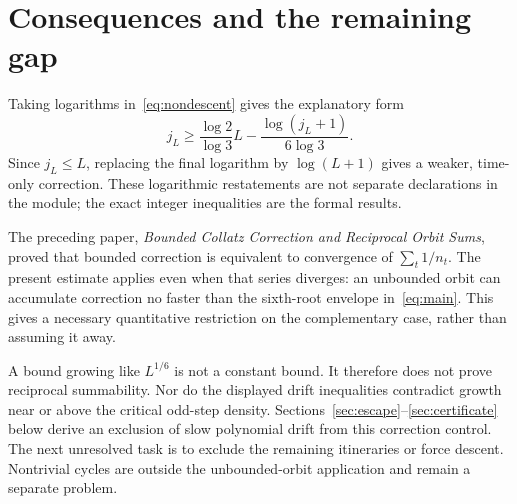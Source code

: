 \documentclass[11pt]{article}
\begin{document}
\newpage
\section{Consequences and the remaining gap}
Taking logarithms in~\eqref{eq:nondescent} gives the explanatory form
\[
j_L\ge\frac{\log2}{\log3}L-\frac{\log(j_L+1)}{6\log3}.
\]
Since $j_L\le L$, replacing the final logarithm by $\log(L+1)$ gives a weaker, time-only correction. These logarithmic restatements are not separate declarations in the module; the exact integer inequalities are the formal results.

The preceding paper, \emph{Bounded Collatz Correction and Reciprocal Orbit Sums}, proved that bounded correction is equivalent to convergence of $\sum_t1/n_t$. The present estimate applies even when that series diverges: an unbounded orbit can accumulate correction no faster than the sixth-root envelope in~\eqref{eq:main}. This gives a necessary quantitative restriction on the complementary case, rather than assuming it away.

A bound growing like $L^{1/6}$ is not a constant bound. It therefore does not prove reciprocal summability. Nor do the displayed drift inequalities contradict growth near or above the critical odd-step density. Sections~\ref{sec:escape}--\ref{sec:certificate} below derive an exclusion of slow polynomial drift from this correction control. The next unresolved task is to exclude the remaining itineraries or force descent. Nontrivial cycles are outside the unbounded-orbit application and remain a separate problem.
\end{document}
